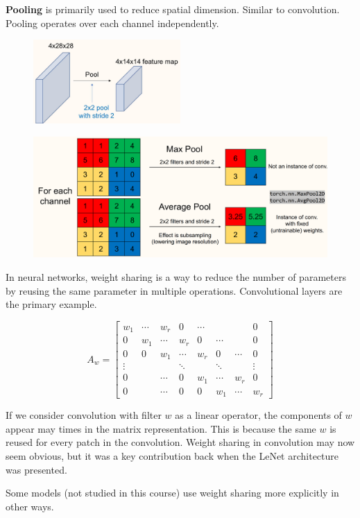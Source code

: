 \documentclass{report}
\begin{document}
\begin{concept}[5.8][Pooling]
    \textbf{Pooling} is primarily used to reduce spatial dimension.
    Similar to convolution.
    Pooling operates over each channel independently.

    \begin{figure}[H]
        \centering
        \includegraphics[width=0.5\textwidth]{.././assets/5.6.jpg}
    \end{figure}

    \begin{figure}[H]
        \centering
        \includegraphics[width=1.0\textwidth]{.././assets/5.7.png}
    \end{figure}
\end{concept}

\begin{concept}
    In neural networks, weight sharing is a way to reduce the number of parameters by reusing the same parameter in multiple operations. Convolutional layers are the primary example.

    $$
    A_{w}=\left[\begin{array}{cccccccc}
    w_{1} & \cdots & w_{r} & 0 & \cdots & & & 0 \\
    0 & w_{1} & \cdots & w_{r} & 0 & \cdots & & 0 \\
    0 & 0 & w_{1} & \cdots & w_{r} & 0 & \cdots & 0 \\
    \vdots & & & \ddots & & \ddots & & \vdots \\
    0 & & \cdots & 0 & w_{1} & \cdots & w_{r} & 0 \\
    0 & & \cdots & 0 & 0 & w_{1} & \cdots & w_{r}
    \end{array}\right]
    $$

    If we consider convolution with filter $w$ as a linear operator, the components of $w$ appear may times in the matrix representation.
    This is because the same $w$ is reused for every patch in the convolution.
    Weight sharing in convolution may now seem obvious, but it was a key contribution back when the LeNet architecture was presented.

    Some models (not studied in this course) use weight sharing more explicitly in other ways.
\end{concept}
\end{document}
